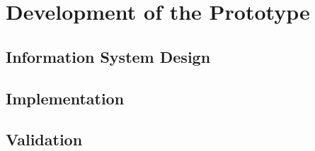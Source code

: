 



\chapter{Development of the Prototype}
\label{chap:prototype}

\section{Information System Design}
\label{sec:system-design}


\section{Implementation}
\label{sec:implementation}

\section{Validation}
\label{sec:val}

